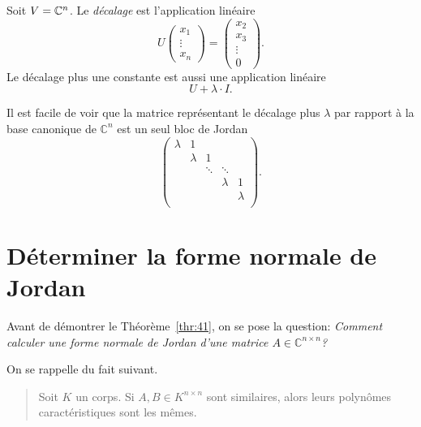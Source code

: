 \begin{definition}
  \label{def:36}
  Soit $V  = \mathbb{C}^n$. Le \emph{décalage}  est l'application linéaire 
  \begin{displaymath}
    U
    \begin{pmatrix}
      x_1 \\ \vdots \\ x_n
    \end{pmatrix}
     = 
     \begin{pmatrix}
       x_2 \\ x_3 \\ \vdots \\ 0
     \end{pmatrix}. 
  \end{displaymath}
  Le décalage plus une constante est aussi une application linéaire 
  \begin{displaymath}
    U + \lambda \cdot I. 
  \end{displaymath}
\end{definition}

Il est facile de voir que la matrice représentant le décalage plus $λ$ par rapport à la base canonique de $\mathbb{C}^n$ est
un seul bloc de Jordan 
\begin{displaymath}
 \begin{pmatrix}
      λ & 1 \\
        & λ & 1 \\
        &   & \ddots & \ddots \\ 
        &   &             & λ & 1 \\
        &   &         &  & λ  \\
    \end{pmatrix}.   
\end{displaymath}




\section{Déterminer la forme normale de Jordan}
\label{sec:determiner-la-forme}

\noindent 
Avant de démontrer le Théorème~\ref{thr:41}, on se pose la question: \emph{Comment calculer une forme normale de Jordan d'une matrice $A ∈ ℂ^{n×n}$?}

On se rappelle du fait suivant.
\begin{quote}
  Soit $K$ un corps. Si $A ,B ∈ K^{n ×n}$ sont similaires, alors leurs polynômes caractéristiques sont les mêmes. 
\end{quote}

